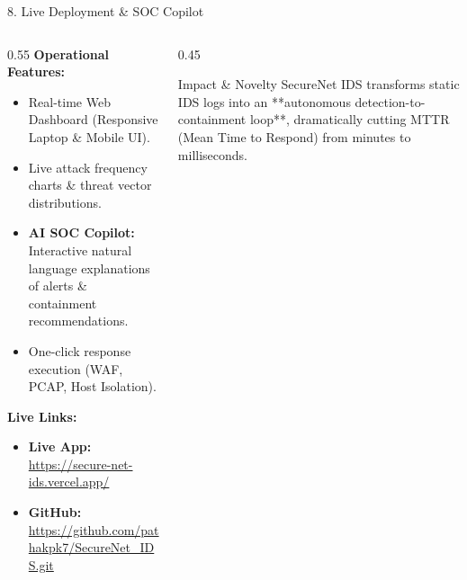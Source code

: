 ﻿\documentclass[aspectratio=169, 10pt]{beamer}
\begin{document}
\begin{frame}{8. Live Deployment \& SOC Copilot}
    \begin{columns}
        \begin{column}{0.55\textwidth}
            \textbf{Operational Features:}
            \begin{itemize}
                \item Real-time Web Dashboard (Responsive Laptop \& Mobile UI).
                \item Live attack frequency charts \& threat vector distributions.
                \item \textbf{AI SOC Copilot:} Interactive natural language explanations of alerts \& containment recommendations.
                \item One-click response execution (WAF, PCAP, Host Isolation).
            \end{itemize}
            
            \vspace{0.2cm}
            \textbf{Live Links:}
            \begin{itemize}
                \item \textbf{Live App:} \url{https://secure-net-ids.vercel.app/}
                \item \textbf{GitHub:} \url{https://github.com/pathakpk7/SecureNet_IDS.git}
            \end{itemize}
        \end{column}
        \begin{column}{0.45\textwidth}
            \begin{exampleblock}{Impact \& Novelty}
                SecureNet IDS transforms static IDS logs into an **autonomous detection-to-containment loop**, dramatically cutting MTTR (Mean Time to Respond) from minutes to milliseconds.
            \end{exampleblock}
        \end{column}
    \end{columns}
\end{frame}
\end{document}
